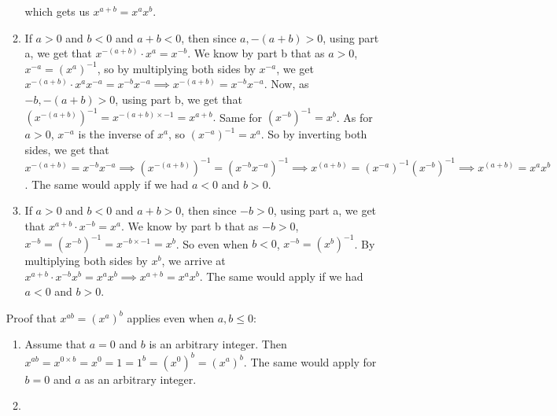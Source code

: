 \documentclass[12pt]{article}
\begin{document}
\begin{enumerate}[label=\textbf{\alph*.}]
\begin{enumerate}[label=\textbf{case \arabic*:}]
                    which gets us $x^{a+b} = x^ax^b$.
                \item
                    If $a > 0$ and $b < 0$ and $a + b < 0$,
                    then since $a, -(a+b) > 0$, using part a,
                    we get that $x^{-(a+b)} \cdot x^{a} = x^{-b}$.
                    We know by part b that as $a > 0$, $x^{-a} = (x^{a})^{-1}$,
                    so by multiplying both sides by $x^{-a}$,
                    we get $x^{-(a+b)} \cdot x^{a}x^{-a} = x^{-b}x^{-a}
                    \implies x^{-(a+b)} = x^{-b}x^{-a}$.
                    Now, as $-b, -(a+b) > 0$, using part b, we get that
                    $(x^{-(a+b)})^{-1} = x^{-(a+b) \times -1} = x^{a+b}.$
                    Same for $(x^{-b})^{-1} = x^b$.
                    As for $a > 0$, $x^{-a}$ is the inverse of $x^{a}$,
                    so $(x^{-a})^{-1} = x^a$.
                    So by inverting both sides,
                    we get that $x^{-(a+b)} = x^{-b}x^{-a}
                    \implies (x^{-(a+b)})^{-1} = (x^{-b}x^{-a})^{-1}
                    \implies x^{(a+b)} = (x^{-a})^{-1}(x^{-b})^{-1}
                    \implies x^{(a+b)} = x^{a}x^{b}$.
                    The same would apply if we had $a < 0$ and $b > 0$.
                \item
                    If $a > 0$ and $b < 0$ and $a + b > 0$,
                    then since $-b > 0$, using part a,
                    we get that $x^{a+b} \cdot x^{-b} = x^{a}$.
                    We know by part b that as $-b > 0$, $x^{-b}
                    = (x^{-b})^{-1} = x^{-b \times -1} = x^{b}$.
                    So even when $b < 0$, $x^{-b} = (x^{b})^{-1}$. 
                    By multiplying both sides by $x^{b}$,
                    we arrive at $x^{a+b} \cdot x^{-b}x^{b} = x^{a}x^{b}
                    \implies x^{a+b} = x^{a}x^{b}$.
                    The same would apply if we had $a < 0$ and $b > 0$.
            \end{enumerate}
            Proof that $x^{ab} = (x^a)^b$ applies even when $a, b \leqslant 0$:
            \begin{enumerate}[label=\textbf{case \arabic*:}]
                \item
                    Assume that $a = 0$ and $b$ is an arbitrary integer.
                    Then $x^{ab} = x^{0 \times b}
                    = x^{0} = 1 = 1^b = (x^{0})^{b}
                    = (x^{a})^{b}$.
                    The same would apply for $b = 0$
                    and $a$ as an arbitrary integer.
                \item

\end{enumerate}
\end{enumerate}
\end{document}
